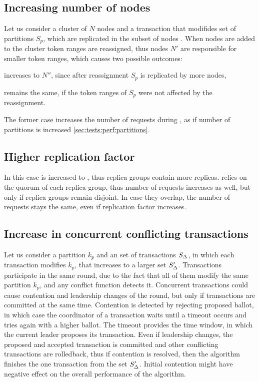 \subsection{Increasing number of nodes}
Let us consider a cluster of $N$ nodes and a transaction that modifides set of partitions $S_{p}$, which are replicated in the subset of nodes \nodesTx.
When nodes are added to the cluster token ranges are reassigned, thus nodes $N'$ are responsible for smaller token ranges, which causes two possible outcomes:
\begin{enumerate*}[label=\alph*)]
\item \nodesTx increases to $N''$, since after reassignment $S_{p}$ is replicated by more nodes,
\item \nodesTx remains the same, if the token ranges of $S_{p}$ were not affected by the reassignment.
\end{enumerate*}

The former case increases the number of requests during \mpt, as if number of partitions is increased \ref{sec:tests:perf:partitions}.

\subsection{Higher replication factor}
In this case \RFalone is increased to \RFalonePrim, thus replica groups contain more replicas. \mpt relies on the quorum of each replica group, thus number of requests increases as well, but only if replica groups remain disjoint. In case they overlap, the number of requests stays the same, even if replication factor increases.

\subsection{Increase in concurrent conflicting transactions}
Let us consider a partition $k_p$ and an set of transactions $S_{\text{$\Delta$}}$, in which each transaction modifies $k_p$, that increases to a larger set $S'_{\text{$\Delta$}}$. 
Transactions participate in the same \paxos round, due to the fact that all of them modify the same partition $k_p$, and any conflict function \label{sec:theory:conflictFunctions} detects it.
Concurrent transactions could cause contention and leadership changes of the \paxos round, but only if transactions are committed at the same time. Contention is detected by rejecting proposed ballot, in which case the coordinator of a transaction waits until a timeout occurs and tries again with a higher ballot. The timeout provides the time window, in which the current leader proposes its transaction. Even if leadership changes, the proposed and accepted transaction is committed and other conflicting transactions are rolledback, thus if contention is resolved, then the algorithm finishes the one transaction from the set $S'_{\text{$\Delta$}}$. Initial contention might have negative effect on the overall performance of the algorithm.

